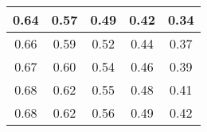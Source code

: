 \begin{large}\begin{tabular}{|c|c|c|c|c|}
\hline
0.64&0.57&0.49&0.42&0.34\\\hline
0.66&0.59&0.52&0.44&0.37\\\hline
0.67&0.60&0.54&0.46&0.39\\\hline
0.68&0.62&0.55&0.48&0.41\\\hline
0.68&0.62&0.56&0.49&0.42\\\hline
\end{tabular}
\end{large}